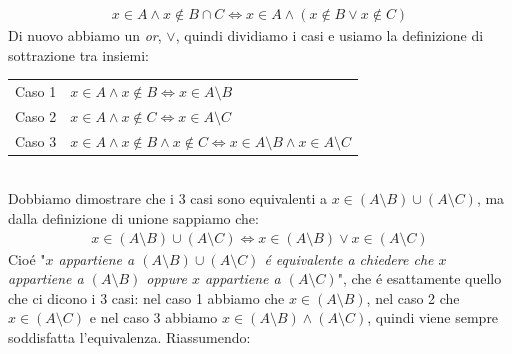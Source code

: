 \documentclass[twoside]{article} %
\begin{document}
	\begin{gather*}
		x\in A \wedge x\notin B\cap C\Leftrightarrow x\in A \wedge (x\notin B \vee x\notin C)
	\end{gather*}
	Di nuovo abbiamo un \textit{or}, $\vee$, quindi dividiamo i casi e usiamo la definizione di sottrazione tra insiemi{\vspace{5pt}}:\\
	\begin{tabular}{cl} 					
		Caso 1 & $x\in A \wedge x\notin B\Leftrightarrow x\in A\setminus B$\\
		Caso 2 & $x\in A \wedge x\notin C\Leftrightarrow x\in A\setminus C$\\
		Caso 3 & $x\in A \wedge x\notin B\wedge x\notin C\Leftrightarrow x\in A\setminus B\wedge x\in A\setminus C$
	\end{tabular}
	{\vspace{5pt}}\\
	\newpage	
	\noindent Dobbiamo dimostrare che i 3 casi sono equivalenti a {$x\in(A\setminus B)\cup (A\setminus C)$}, ma dalla definizione di unione sappiamo che:
	\begin{gather*}
		x\in(A\setminus B)\cup (A\setminus C) \Leftrightarrow x\in (A\setminus B) \vee x\in (A\setminus C)	
	\end{gather*}
	Cio\'e "\textit{$x$ appartiene a $(A\setminus B)\cup (A\setminus C)$ \'e equivalente a chiedere che $x$ appartiene a $(A\setminus B)$ oppure $x$ appartiene a $(A\setminus C)$}", che \'e esattamente quello che ci dicono i 3 casi: nel caso 1 abbiamo che $x\in (A\setminus B)$, nel caso 2 che $x\in (A\setminus C)$ e nel caso 3 abbiamo $x\in (A\setminus B)\wedge (A\setminus C)$, quindi viene sempre soddisfatta l'equivalenza. Riassumendo:
  
\end{document}
